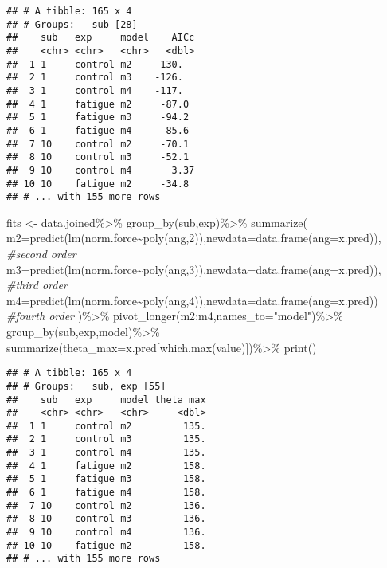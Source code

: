 \documentclass[
]{article}
\newenvironment{Shaded}{\begin{snugshade}}{\end{snugshade}}
\newcommand{\AttributeTok}[1]{\textcolor[rgb]{0.77,0.63,0.00}{#1}}
\newcommand{\CommentTok}[1]{\textcolor[rgb]{0.56,0.35,0.01}{\textit{#1}}}
\newcommand{\DecValTok}[1]{\textcolor[rgb]{0.00,0.00,0.81}{#1}}
\newcommand{\FunctionTok}[1]{\textcolor[rgb]{0.00,0.00,0.00}{#1}}
\newcommand{\NormalTok}[1]{#1}
\newcommand{\OtherTok}[1]{\textcolor[rgb]{0.56,0.35,0.01}{#1}}
\newcommand{\SpecialCharTok}[1]{\textcolor[rgb]{0.00,0.00,0.00}{#1}}
\newcommand{\StringTok}[1]{\textcolor[rgb]{0.31,0.60,0.02}{#1}}
\begin{document}
\begin{verbatim}
## # A tibble: 165 x 4
## # Groups:   sub [28]
##    sub   exp     model    AICc
##    <chr> <chr>   <chr>   <dbl>
##  1 1     control m2    -130.  
##  2 1     control m3    -126.  
##  3 1     control m4    -117.  
##  4 1     fatigue m2     -87.0 
##  5 1     fatigue m3     -94.2 
##  6 1     fatigue m4     -85.6 
##  7 10    control m2     -70.1 
##  8 10    control m3     -52.1 
##  9 10    control m4       3.37
## 10 10    fatigue m2     -34.8 
## # ... with 155 more rows
\end{verbatim}

\begin{Shaded}
\begin{Highlighting}[]
\NormalTok{fits }\OtherTok{\textless{}{-}}\NormalTok{ data.joined}\SpecialCharTok{\%\textgreater{}\%}
  \FunctionTok{group\_by}\NormalTok{(sub,exp)}\SpecialCharTok{\%\textgreater{}\%}
  \FunctionTok{summarize}\NormalTok{(}
    \AttributeTok{m2=}\FunctionTok{predict}\NormalTok{(}\FunctionTok{lm}\NormalTok{(norm.force}\SpecialCharTok{\textasciitilde{}}\FunctionTok{poly}\NormalTok{(ang,}\DecValTok{2}\NormalTok{)),}\AttributeTok{newdata=}\FunctionTok{data.frame}\NormalTok{(}\AttributeTok{ang=}\NormalTok{x.pred)), }\CommentTok{\#second order}
    \AttributeTok{m3=}\FunctionTok{predict}\NormalTok{(}\FunctionTok{lm}\NormalTok{(norm.force}\SpecialCharTok{\textasciitilde{}}\FunctionTok{poly}\NormalTok{(ang,}\DecValTok{3}\NormalTok{)),}\AttributeTok{newdata=}\FunctionTok{data.frame}\NormalTok{(}\AttributeTok{ang=}\NormalTok{x.pred)), }\CommentTok{\#third order}
    \AttributeTok{m4=}\FunctionTok{predict}\NormalTok{(}\FunctionTok{lm}\NormalTok{(norm.force}\SpecialCharTok{\textasciitilde{}}\FunctionTok{poly}\NormalTok{(ang,}\DecValTok{4}\NormalTok{)),}\AttributeTok{newdata=}\FunctionTok{data.frame}\NormalTok{(}\AttributeTok{ang=}\NormalTok{x.pred)) }\CommentTok{\#fourth order}
\NormalTok{  )}\SpecialCharTok{\%\textgreater{}\%}
  \FunctionTok{pivot\_longer}\NormalTok{(m2}\SpecialCharTok{:}\NormalTok{m4,}\AttributeTok{names\_to=}\StringTok{"model"}\NormalTok{)}\SpecialCharTok{\%\textgreater{}\%}
  \FunctionTok{group\_by}\NormalTok{(sub,exp,model)}\SpecialCharTok{\%\textgreater{}\%}
  \FunctionTok{summarize}\NormalTok{(}\AttributeTok{theta\_max=}\NormalTok{x.pred[}\FunctionTok{which.max}\NormalTok{(value)])}\SpecialCharTok{\%\textgreater{}\%}
  \FunctionTok{print}\NormalTok{()}
\end{Highlighting}
\end{Shaded}

\begin{verbatim}
## # A tibble: 165 x 4
## # Groups:   sub, exp [55]
##    sub   exp     model theta_max
##    <chr> <chr>   <chr>     <dbl>
##  1 1     control m2         135.
##  2 1     control m3         135.
##  3 1     control m4         135.
##  4 1     fatigue m2         158.
##  5 1     fatigue m3         158.
##  6 1     fatigue m4         158.
##  7 10    control m2         136.
##  8 10    control m3         136.
##  9 10    control m4         136.
## 10 10    fatigue m2         158.
## # ... with 155 more rows
\end{verbatim}
\end{document}
